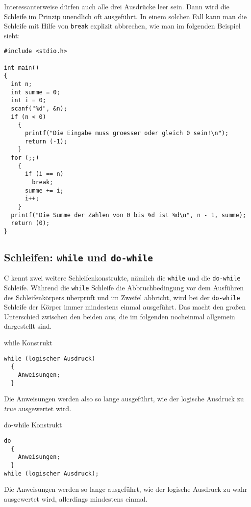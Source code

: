 Interessanterweise dürfen auch alle drei Ausdrücke leer sein.
Dann wird die Schleife im Prinzip unendlich oft ausgeführt.
In einem solchen Fall kann man die Schleife mit Hilfe von \verb|break| explizit abbrechen, wie man im folgenden Beispiel sieht:
\begin{lstlisting}
#include <stdio.h>

int main()
{
  int n;
  int summe = 0;
  int i = 0;
  scanf("%d", &n);
  if (n < 0)
    {
      printf("Die Eingabe muss groesser oder gleich 0 sein!\n");
      return (-1);
    }
  for (;;)
    {
      if (i == n)
        break;
      summe += i;
      i++;
    }
  printf("Die Summe der Zahlen von 0 bis %d ist %d\n", n - 1, summe);
  return (0);
}
\end{lstlisting}

\subsection{Schleifen: \texttt{while} und \texttt{do-while}}

C kennt zwei weitere Schleifenkonstrukte, nämlich die \verb|while| und die \verb|do-while| Schleife.
Während die \verb|while| Schleife die Abbruchbedingung vor dem Ausführen des Schleifenkörpers überprüft und im Zweifel abbricht, wird bei der \verb|do-while| Schleife der Körper immer mindestens einmal ausgeführt.
Das macht den großen Unterschied zwischen den beiden aus, die im folgenden nocheinmal allgemein dargestellt sind.
\begin{myalertblock}{while Konstrukt}
\begin{lstlisting}
while (logischer Ausdruck)
  {
    Anweisungen;
  }
\end{lstlisting}
\vspace{-0.5cm}
Die Anweisungen werden also so lange ausgeführt, wie der logische Ausdruck zu \emph{true} ausgewertet wird.
\end{myalertblock}

\begin{myalertblock}{do-while Konstrukt}
\begin{lstlisting}
do
  {
    Anweisungen;
  }
while (logischer Ausdruck);
\end{lstlisting}
\vspace{-0.5cm}
Die Anweisungen werden so lange ausgeführt, wie der logische Ausdruck zu wahr ausgewertet wird, allerdings mindestens einmal.
\end{myalertblock}

\endinput
